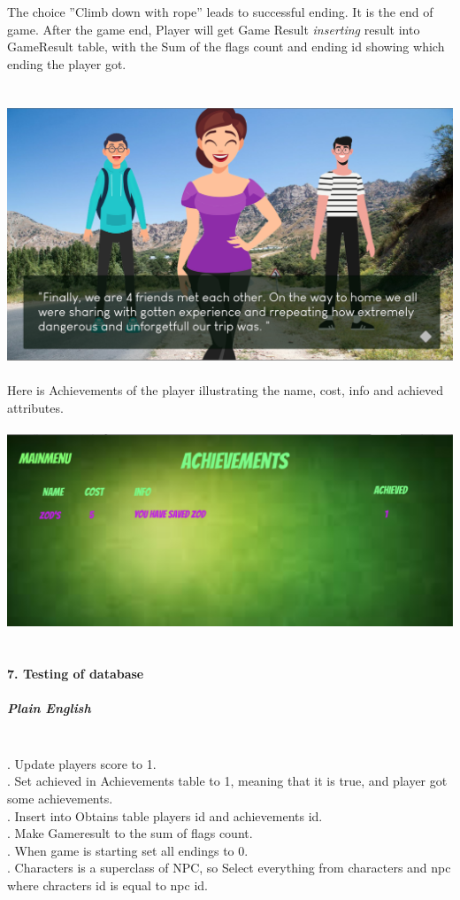 \documentclass[12pt,a4paper]{article}
\newcommand{\ind}{\indent\indent}
\begin{document}
\ind\\ \ind\\
The choice ''Climb down with rope'' leads to successful ending. It is the end of game. After the game end, Player will get Game Result \textit{inserting} result into GameResult table, with the Sum of the flags count and ending id showing which ending the player got.\\
\ind\\ \ind\\
\includegraphics[scale=0.35]{images/6}
\ind\\ \ind\\
Here is Achievements of the player illustrating the name, cost, info and achieved attributes.
\ind\\ \ind\\
\includegraphics[scale=0.35]{images/achievements}
\ind\\ \ind\\
\paragraph{7. Testing of database\\}
\subparagraph{Plain English\\}
\ind\\
\ind 6. Update players score to 1.\\
\ind 2. Set achieved in Achievements table to 1, meaning that it is true, and player got some achievements.\\
\ind 3. Insert into Obtains table players id and achievements id.\\
\ind 4. Make Gameresult to the sum of flags count. \\
\ind 5. When game is starting set all endings to 0.\\
\ind 6. Characters is a superclass of NPC, so Select everything from characters and npc where chracters id is equal to npc id.\\
\end{document}
